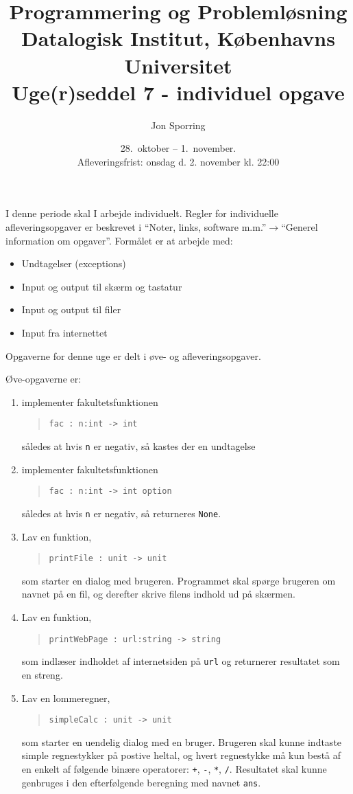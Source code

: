 \documentclass[a4paper,12pt]{article}
\title{Programmering og Problemløsning\\Datalogisk Institut,
  Københavns Universitet\\Uge(r)seddel 7 - individuel opgave}
\author{Jon Sporring}
\date{28.\ oktober -- 1.\ november.\\Afleveringsfrist: onsdag d. 2. november kl. 22:00}
\begin{document}
\maketitle

I denne periode skal I arbejde individuelt. Regler for individuelle afleveringsopgaver er beskrevet i "`Noter, links, software m.m."'$\rightarrow$"`Generel information om opgaver"'. Formålet er at arbejde med:
\begin{itemize}
\item Undtagelser (exceptions)
\item Input og output til skærm og tastatur
\item Input og output til filer
\item Input fra internettet
\end{itemize}

Opgaverne for denne uge er delt i øve- og afleveringsopgaver. 

Øve-opgaverne er:
\begin{enumerate}[label=7ø.\arabic*,start=0]
\item implementer fakultetsfunktionen
  \begin{quote}
    \mbox{\lstinline!fac : n:int -> int!}
  \end{quote}
  således at hvis \lstinline!n! er negativ, så kastes der en undtagelse
\item implementer fakultetsfunktionen
  \begin{quote}
    \mbox{\lstinline!fac : n:int -> int option!}
  \end{quote}
  således at hvis \lstinline!n! er negativ, så returneres \lstinline!None!.
\item Lav en funktion,
  \begin{quote}
    \mbox{\lstinline!printFile : unit -> unit!}
  \end{quote}
  som starter en dialog med brugeren. Programmet skal spørge brugeren om navnet på en fil, og derefter skrive filens indhold ud på skærmen.
\item Lav en funktion, 
  \begin{quote}
    \mbox{\lstinline!printWebPage : url:string -> string!}
  \end{quote}
  som indlæser indholdet af internetsiden på \lstinline!url! og returnerer resultatet som en streng.
\item Lav en lommeregner,
  \begin{quote}
    \mbox{\lstinline!simpleCalc : unit -> unit!}
  \end{quote}
  som starter en uendelig dialog med en bruger. Brugeren skal kunne indtaste simple regnestykker på postive heltal, og hvert regnestykke må kun bestå af en enkelt af følgende binære operatorer: \lstinline!+!, \lstinline!-!, \lstinline!*!, \lstinline!/!. Resultatet skal kunne genbruges i den efterfølgende beregning med navnet \lstinline!ans!.
\end{enumerate}
\end{document}
